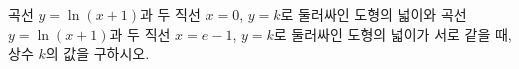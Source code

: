 \hspace*{2mm}\begin{minipage}[t]{\dimexpr\linewidth-2mm\relax}\vspace{0pt}
곡선 $y=\ln(x+1)$과 두 직선 $x=0$, $y=k$로 둘러싸인 도형의 넓이와 곡선 $y=\ln(x+1)$과 두 직선 $x=e-1$, $y=k$로 둘러싸인 도형의 넓이가 서로 같을 때, 상수 $k$의 값을 구하시오. \end{minipage}
